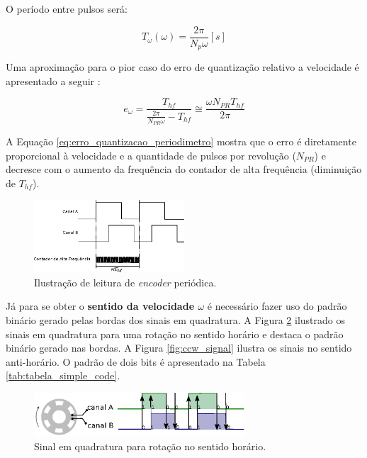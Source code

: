 O período entre pulsos será:

\begin{equation}
    T_{\omega}(\omega) = \frac{2\pi}{N_{p}\omega} [s]
\end{equation}

Uma aproximação para o pior caso do erro de quantização relativo a velocidade é apresentado a seguir \cite{analise_incr_enc}:

\begin{equation}
    e_{\omega} = \frac{T_{hf}}{ \frac{2\pi}{N_{PR} \omega} - T_{hf} } \cong \frac{\omega N_{PR} T_{hf}}{2\pi}
    \label{eq:erro_quantizacao_periodimetro}
\end{equation}

A Equação \ref{eq:erro_quantizacao_periodimetro} mostra que o erro é diretamente proporcional à velocidade e a quantidade de pulsos por revolução ($N_{PR}$) e decresce com o aumento da frequência do contador de alta frequência (diminuição de $T_{hf}$).


\begin{figure}[H]
    \centering
    \includegraphics[width=0.5\textwidth]{figuras/ilustracoes/ilustracao_medicao_encoder_por_periodo.eps}
    \caption{Ilustração de leitura de \emph{encoder} periódica.}
    \label{fig:ilustracao_periodimetro}
\end{figure}

Já para se obter o \textbf{sentido da velocidade $\omega$} é necessário fazer uso do padrão binário gerado pelas bordas dos sinais em quadratura. A Figura \ref{fig:cw_signal} ilustrado os sinais em quadratura para uma rotação no sentido horário e destaca o padrão binário gerado nas bordas. A Figura \ref{fig:ccw_signal} ilustra os sinais no sentido anti-horário. O padrão de dois bits é apresentado na Tabela \ref{tab:tabela_simple_code}. \\

\begin{figure}[H]
    \centering
    \includegraphics[width=0.7\textwidth]{figuras/ilustracoes/sinal_enquadratura_sentido_CW.eps}
    \caption{Sinal em quadratura para rotação no sentido horário.}
    \label{fig:cw_signal}
\end{figure}

